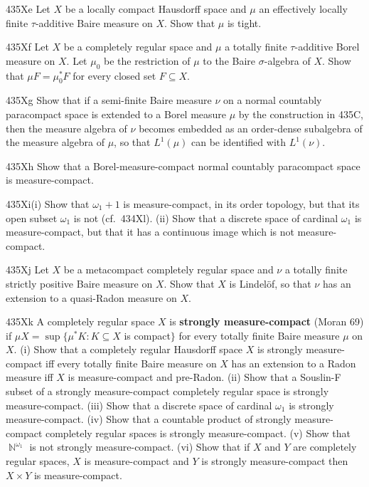 {\spheader 435Xe Let $X$ be a locally compact Hausdorff space and $\mu$
an effectively locally finite $\tau$-additive Baire measure on $X$.
Show that $\mu$ is tight.

\sqheader 435Xf Let $X$ be a completely regular space and $\mu$ a
totally finite $\tau$-additive Borel measure on $X$.   Let $\mu_0$ be
the restriction of $\mu$ to the Baire $\sigma$-algebra of $X$.   Show
that $\mu F=\mu_0^*F$ for every closed set $F\subseteq X$.

\spheader 435Xg Show that if a semi-finite Baire measure $\nu$ on a
normal countably paracompact space is extended to a Borel measure $\mu$
by the construction in 435C, then the measure algebra of $\nu$ becomes
embedded as an order-dense subalgebra of the measure algebra of $\mu$,
so that $L^1(\mu)$ can be identified with $L^1(\nu)$.

\spheader 435Xh Show
that a Borel-measure-compact normal countably paracompact
space is measure-compact.

\spheader 435Xi(i) Show that $\omega_1+1$ is measure-compact, in its
order topology, but that its open subset $\omega_1$ is not (cf.\ 434Xl).
(ii) Show
that a discrete space of cardinal $\omega_1$ is measure-compact, but
that it has a continuous image which is not measure-compact.

\spheader 435Xj Let $X$ be a metacompact completely regular space and
$\nu$ a totally finite strictly positive Baire measure on $X$.   Show
that $X$ is Lindel\"of, so that $\nu$ has an extension to a quasi-Radon
measure on $X$.   

\spheader 435Xk A completely regular space $X$ is {\bf strongly
measure-compact} ({\smc Moran 69}) if
$\mu X=\sup\{\mu^*K:K\subseteq X$ is compact$\}$ for every totally
finite Baire measure $\mu$ on $X$.   (i) Show that a
completely regular Hausdorff space $X$ is strongly measure-compact iff
every totally finite Baire measure on $X$ has an extension to a Radon
measure iff $X$ is measure-compact and pre-Radon.   (ii) Show that a Souslin-F subset of a
strongly measure-compact completely regular space is strongly
measure-compact.   (iii) Show that a discrete space of cardinal
$\omega_1$ is strongly measure-compact.   (iv) Show that a countable
product of strongly measure-compact completely regular spaces is
strongly measure-compact.   (v) Show that $\BbbN^{\omega_1}$ is not
strongly measure-compact.     (vi) Show
that if $X$ and $Y$ are completely regular
spaces, $X$ is measure-compact and $Y$ is strongly measure-compact then
$X\times Y$ is measure-compact.

}
